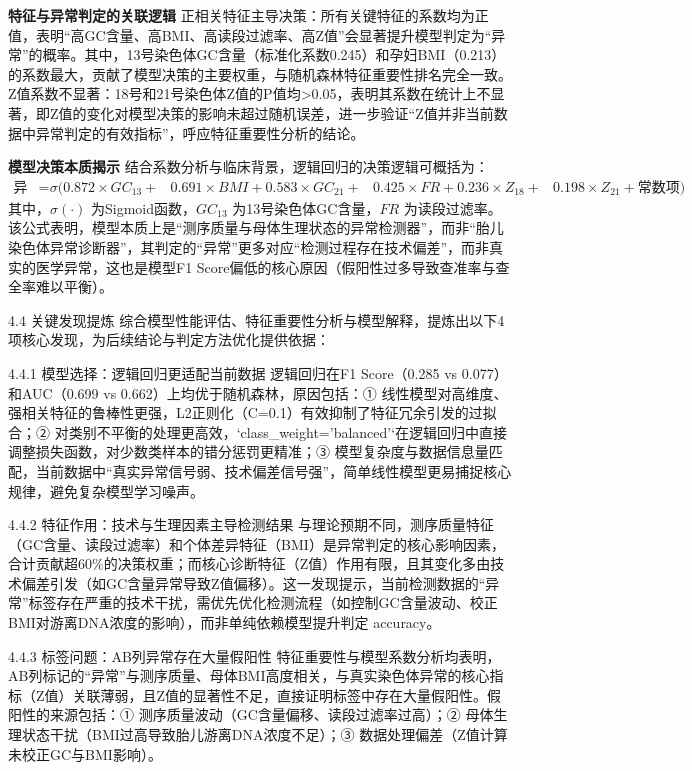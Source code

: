 \documentclass[withoutpreface,bwprint]{cumcmthesis} %
\begin{document}
\textbf{特征与异常判定的关联逻辑}
正相关特征主导决策：所有关键特征的系数均为正值，表明“高GC含量、高BMI、高读段过滤率、高Z值”会显著提升模型判定为“异常”的概率。其中，13号染色体GC含量（标准化系数0.245）和孕妇BMI（0.213）的系数最大，贡献了模型决策的主要权重，与随机森林特征重要性排名完全一致。  
Z值系数不显著：18号和21号染色体Z值的P值均>0.05，表明其系数在统计上不显著，即Z值的变化对模型决策的影响未超过随机误差，进一步验证“Z值并非当前数据中异常判定的有效指标”，呼应特征重要性分析的结论。


\textbf{模型决策本质揭示}
结合系数分析与临床背景，逻辑回归的决策逻辑可概括为：  
\begin{align}
\text{异常概率} = & \sigma( 0.872 \times GC_{13} +  
                & 0.691 \times BMI + 0.583 \times GC_{21} + 
                & 0.425 \times FR + 0.236 \times Z_{18} + 
                & 0.198 \times Z_{21} + \text{常数项} ) 
\end{align} 
其中，\( \sigma(\cdot) \) 为Sigmoid函数，\( GC_{13} \) 为13号染色体GC含量，\( FR \) 为读段过滤率。该公式表明，模型本质上是“测序质量与母体生理状态的异常检测器”，而非“胎儿染色体异常诊断器”，其判定的“异常”更多对应“检测过程存在技术偏差”，而非真实的医学异常，这也是模型F1 Score偏低的核心原因（假阳性过多导致查准率与查全率难以平衡）。


4.4 关键发现提炼
综合模型性能评估、特征重要性分析与模型解释，提炼出以下4项核心发现，为后续结论与判定方法优化提供依据：

4.4.1 模型选择：逻辑回归更适配当前数据
逻辑回归在F1 Score（0.285 vs 0.077）和AUC（0.699 vs 0.662）上均优于随机森林，原因包括：① 线性模型对高维度、强相关特征的鲁棒性更强，L2正则化（C=0.1）有效抑制了特征冗余引发的过拟合；② 对类别不平衡的处理更高效，`class\_weight='balanced'`在逻辑回归中直接调整损失函数，对少数类样本的错分惩罚更精准；③ 模型复杂度与数据信息量匹配，当前数据中“真实异常信号弱、技术偏差信号强”，简单线性模型更易捕捉核心规律，避免复杂模型学习噪声。

4.4.2 特征作用：技术与生理因素主导检测结果
与理论预期不同，测序质量特征（GC含量、读段过滤率）和个体差异特征（BMI）是异常判定的核心影响因素，合计贡献超60\%的决策权重；而核心诊断特征（Z值）作用有限，且其变化多由技术偏差引发（如GC含量异常导致Z值偏移）。这一发现提示，当前检测数据的“异常”标签存在严重的技术干扰，需优先优化检测流程（如控制GC含量波动、校正BMI对游离DNA浓度的影响），而非单纯依赖模型提升判定 accuracy。

4.4.3 标签问题：AB列异常存在大量假阳性
特征重要性与模型系数分析均表明，AB列标记的“异常”与测序质量、母体BMI高度相关，与真实染色体异常的核心指标（Z值）关联薄弱，且Z值的显著性不足，直接证明标签中存在大量假阳性。假阳性的来源包括：① 测序质量波动（GC含量偏移、读段过滤率过高）；② 母体生理状态干扰（BMI过高导致胎儿游离DNA浓度不足）；③ 数据处理偏差（Z值计算未校正GC与BMI影响）。
\end{document}
